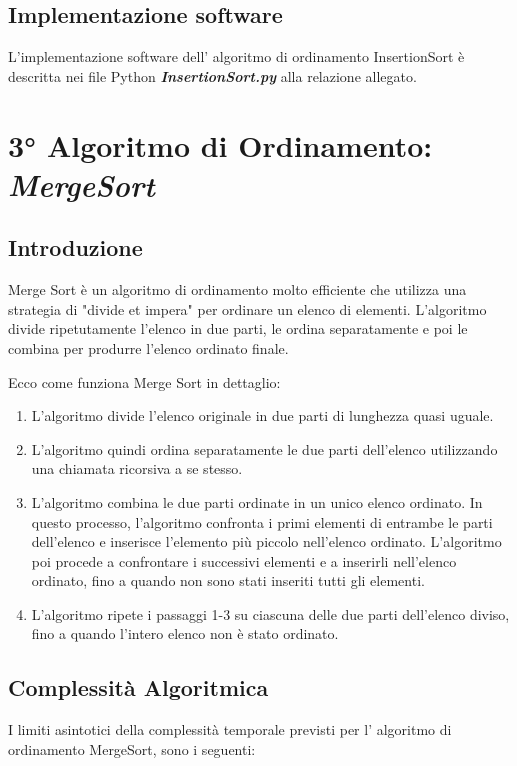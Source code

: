\documentclass{article}
\begin{document}
		\subsection{Implementazione software}
			L'implementazione software dell' algoritmo di ordinamento InsertionSort è descritta nei file Python \textbf{\textit{InsertionSort.py}} alla relazione allegato.
		
	\newpage
	\section{3° Algoritmo di Ordinamento: \textit{MergeSort}}
		\subsection{Introduzione}
			Merge Sort è un algoritmo di ordinamento molto efficiente che utilizza una strategia di "divide et impera" per ordinare un elenco di elementi. L'algoritmo divide ripetutamente l'elenco in due parti, le ordina separatamente e poi le combina per produrre l'elenco ordinato finale.
			
			Ecco come funziona Merge Sort in dettaglio:
			\begin{enumerate}
				\item L'algoritmo divide l'elenco originale in due parti di lunghezza quasi uguale.
				
				\item L'algoritmo quindi ordina separatamente le due parti dell'elenco utilizzando una chiamata ricorsiva a se stesso.
				
				\item L'algoritmo combina le due parti ordinate in un unico elenco ordinato. In questo processo, l'algoritmo confronta i primi elementi di entrambe le parti dell'elenco e inserisce l'elemento più piccolo nell'elenco ordinato. L'algoritmo poi procede a confrontare i successivi elementi e a inserirli nell'elenco ordinato, fino a quando non sono stati inseriti tutti gli elementi.
				
				\item L'algoritmo ripete i passaggi 1-3 su ciascuna delle due parti dell'elenco diviso, fino a quando l'intero elenco non è stato ordinato.
			\end{enumerate}

		\subsection{Complessità Algoritmica}
			I limiti asintotici della complessità temporale previsti per l' algoritmo di ordinamento MergeSort, sono i seguenti:
			
\end{document}
